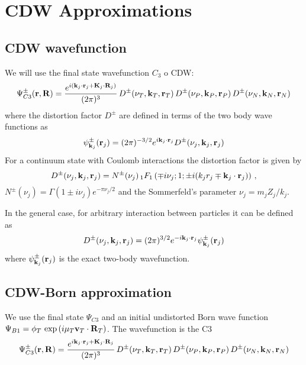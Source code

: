 \chapter{CDW Approximations}

\section{CDW wavefunction}
We will use the final state wavefunction $C_{3}$ o CDW:
%
\begin{equation}\label{Q:C3}
\Psi^{\pm}_{C3} (\mathbf{r},\mathbf{R}) = \frac{e^{i (\mathbf{k}_j\cdot
\mathbf{r}_j+\mathbf{K}_j\cdot \mathbf{R}_j)}}{(2 \pi)^3} \,
D^{\pm}(\nu_T,\mathbf{k}_T,\mathbf{r}_T) \, D^{\pm}(\nu_P,\mathbf{k}_P,\mathbf{r}_P)
\,D^{\pm}(\nu_N,\mathbf{k}_N,\mathbf{r}_N)
\end{equation}
%
where the distortion factor $D^{\pm}$ are defined in terms of the two body
wave functions as
\[
 \psi^{\pm}_{\mathbf{k}_j}(\mathbf{r}_j)  = (2\pi)^{-3/2}e^{i \mathbf{k}_{j}
 \cdot \mathbf{r}_{j}} D^{\pm}(\nu_j,\mathbf{k}_{j},\mathbf{r}_{j})
\]
%
For a continuum state with Coulomb interactions the distortion factor
is given by
%
\begin{equation}\label{Q:DFactCoul}
 D^{\pm}(\nu_j,\mathbf{k}_{j},\mathbf{r}_{j})= N^{\pm}(\nu_{j}) \,{_1F_1}\left(
\mp i \nu_{j};1; {\pm} i (k_{j} r_{j} \mp \mathbf{k}_{j} \cdot\mathbf{r}_{j}
) \right) \, ,
\end{equation}
%
$N^{\pm}(\nu_j)= \Gamma(1 {\pm} i\nu_j) e^{-\pi \nu_j/2}$ and the
Sommerfeld's parameter $\nu_j = m_j Z_j/ k_j$.

In the general case, for arbitrary interaction between particles it can
be defined as
\begin{equation}\label{Q:DFact}
D^{\pm}(\nu_j,\mathbf{k}_j,\mathbf{r}_j)  = (2\pi)^{3/2}e^{ - i\mathbf{k}_j \cdot
\mathbf{r}_j} \psi^{\pm}_{\mathbf{k}_j}(\mathbf{r}_j)
\end{equation}
where $\psi^{\pm}_{\mathbf{k}_j}(\mathbf{r}_j)$ is the exact two-body wavefunction.


\section{CDW-Born approximation}

We use the final state $\Psi_{C3}$ and an initial undistorted Born wave
function $\Psi_{B1}=\phi_{T} \, \exp{ \left( i \mu_{T} \mathbf{v}_{T}
\cdot \mathbf{R}_{T} \right)}$. The wavefunction is the C3
\begin{equation} \label{Q:FCC1}
\Psi^{\pm}_{C3} (\mathbf{r},\mathbf{R}) = \frac{e^{i {\bf k}_j\cdot {\bf r}_j+{\bf
K}_j\cdot {\bf R}_j}}{(2 \pi)^3} \, D^{\pm}(\nu_T,{\bf k}_T,{\bf r}_T) \,
D^{\pm}(\nu_P,{\bf k}_P,{\bf r}_P) \,D^{\pm}(\nu_N,{\bf k}_N,{\bf r}_N)
\end{equation}

